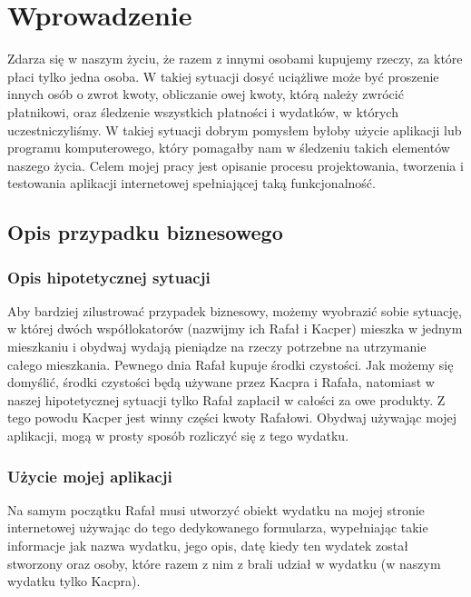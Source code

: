 \newpage %
\section{Wprowadzenie}
Zdarza się w naszym życiu, że razem z innymi osobami kupujemy rzeczy, za które płaci tylko jedna osoba. W takiej sytuacji dosyć uciążliwe może być proszenie innych osób o zwrot kwoty, obliczanie owej kwoty, którą należy zwrócić płatnikowi, oraz śledzenie wszystkich płatności i wydatków, w których uczestniczyliśmy. W takiej sytuacji dobrym pomysłem byłoby użycie aplikacji lub programu komputerowego, który pomagałby nam w śledzeniu takich elementów naszego życia. Celem mojej pracy jest opisanie procesu projektowania, tworzenia i testowania aplikacji internetowej spełniającej taką funkcjonalność.

\subsection{Opis przypadku biznesowego}
\subsubsection{Opis hipotetycznej sytuacji}

Aby bardziej zilustrować przypadek biznesowy, możemy wyobrazić sobie sytuację, w której dwóch współlokatorów (nazwijmy ich Rafał i Kacper) mieszka w jednym mieszkaniu i obydwaj wydają pieniądze na rzeczy potrzebne na utrzymanie całego mieszkania. Pewnego dnia Rafał kupuje środki czystości. Jak możemy się domyślić, środki czystości będą używane przez Kacpra i Rafała, natomiast w naszej hipotetycznej sytuacji tylko Rafał zapłacił w całości za owe produkty. Z tego powodu Kacper jest winny części kwoty Rafałowi. Obydwaj używając mojej aplikacji, mogą w prosty sposób rozliczyć się z tego wydatku.

\subsubsection{Użycie mojej aplikacji}

Na samym początku Rafał musi utworzyć obiekt wydatku na mojej stronie internetowej używając do tego dedykowanego formularza, wypełniając takie informacje jak nazwa wydatku, jego opis, datę kiedy ten wydatek został stworzony oraz osoby, które razem z nim z brali udział w wydatku (w naszym wydatku tylko Kacpra).

